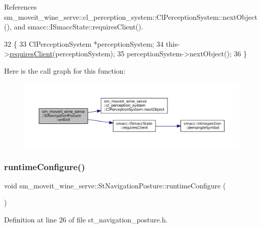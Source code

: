 References sm\+\_\+moveit\+\_\+wine\+\_\+serve\+::cl\+\_\+perception\+\_\+system\+::\+Cl\+Perception\+System\+::next\+Object(), and smacc\+::\+I\+Smacc\+State\+::requires\+Client().


\begin{DoxyCode}
32         \{
33             ClPerceptionSystem *perceptionSystem;
34             this->\hyperlink{classsmacc_1_1ISmaccState_a7f95c9f0a6ea2d6f18d1aec0519de4ac}{requiresClient}(perceptionSystem);
35             perceptionSystem->nextObject();
36         \}
\end{DoxyCode}
Here is the call graph for this function\+:
\nopagebreak
\begin{figure}[H]
\begin{center}
\leavevmode
\includegraphics[width=350pt]{structsm__moveit__wine__serve_1_1StNavigationPosture_a78436f77e573ba406b0deeb7bfb1f7ac_cgraph}
\end{center}
\end{figure}
\mbox{\label{structsm__moveit__wine__serve_1_1StNavigationPosture_a343cdcbcfe8a13584b2d9489199b51da}} 
\subsubsection{\texorpdfstring{runtime\+Configure()}{runtimeConfigure()}}
{\footnotesize\ttfamily void sm\+\_\+moveit\+\_\+wine\+\_\+serve\+::\+St\+Navigation\+Posture\+::runtime\+Configure (\begin{DoxyParamCaption}{ }\end{DoxyParamCaption})\hspace{0.3cm}{\ttfamily [inline]}}



Definition at line 26 of file st\+\_\+navigation\+\_\+posture.\+h.


